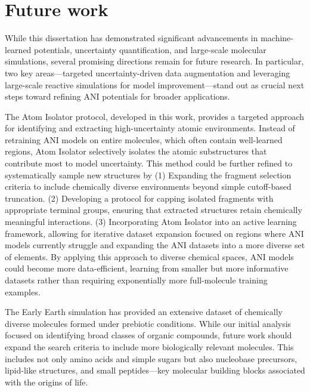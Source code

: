 \chapter{Future work} 
\label{future_work}

While this dissertation has demonstrated significant advancements in machine-learned potentials, uncertainty quantification, and large-scale molecular simulations, several promising directions remain for future research. In particular, two key areas—targeted uncertainty-driven data augmentation and leveraging large-scale reactive simulations for model improvement—stand out as crucial next steps toward refining ANI potentials for broader applications.

The Atom Isolator protocol, developed in this work, provides a targeted approach for identifying and extracting high-uncertainty atomic environments. Instead of retraining ANI models on entire molecules, which often contain well-learned regions, Atom Isolator selectively isolates the atomic substructures that contribute most to model uncertainty. This method could be further refined to systematically sample new structures by (1) Expanding the fragment selection criteria to include chemically diverse environments beyond simple cutoff-based truncation. (2) Developing a protocol for capping isolated fragments with appropriate terminal groups, ensuring that extracted structures retain chemically meaningful interactions. (3) Incorporating Atom Isolator into an active learning framework, allowing for iterative dataset expansion focused on regions where ANI models currently struggle and expanding the ANI datasets into a more diverse set of elements.
By applying this approach to diverse chemical spaces, ANI models could become more data-efficient, learning from smaller but more informative datasets rather than requiring exponentially more full-molecule training examples.

The Early Earth simulation has provided an extensive dataset of chemically diverse molecules formed under prebiotic conditions. While our initial analysis focused on identifying broad classes of organic compounds, future work should expand the search criteria to include more biologically relevant molecules. This includes not only amino acids and simple sugars but also nucleobase precursors, lipid-like structures, and small peptides—key molecular building blocks associated with the origins of life.

